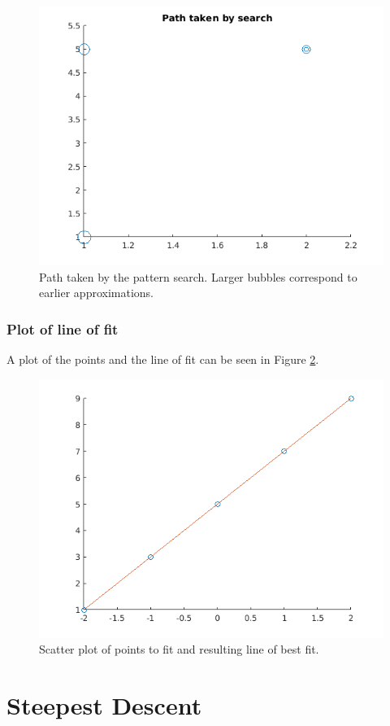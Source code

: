 \documentclass{article}
\begin{document}
\begin{figure}
	\centering
	\includegraphics[width=0.75\linewidth]{path-taken-by-search}
	\caption{Path taken by the pattern search. Larger bubbles correspond to earlier approximations.}
	\label{fig:path}
\end{figure}

\subsubsection{Plot of line of fit}

A plot of the points and the line of fit can be seen in Figure \ref{fig:line-of-fit}.

\begin{figure}
	\centering
	\includegraphics[width=0.75\linewidth]{line-of-fit}
	\caption{Scatter plot of points to fit and resulting line of best fit.}
	\label{fig:line-of-fit}
\end{figure}

\section{Steepest Descent}
\end{document}
